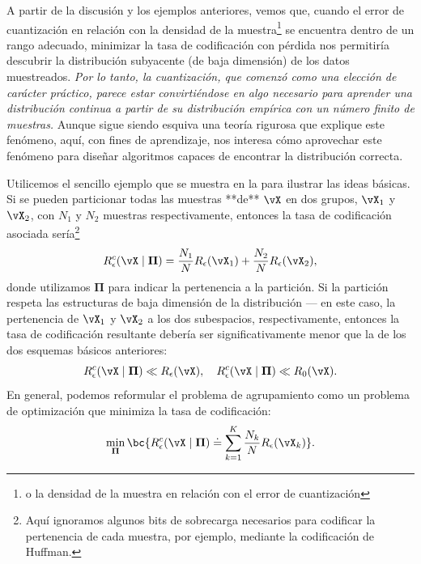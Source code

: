 \documentclass[../../book-main.tex]{subfiles}
\begin{document}
A partir de la discusión y los ejemplos anteriores, vemos que, cuando el
error de cuantización en relación con la densidad de la muestra\footnote{o la
densidad de la muestra en relación con el error de cuantización} se encuentra dentro de un
rango adecuado, minimizar la tasa de codificación con pérdida nos permitiría descubrir
la distribución subyacente (de baja dimensión) de los datos muestreados.
{\em Por lo tanto, la cuantización, que comenzó como una elección de carácter práctico, parece
    estar convirtiéndose en algo necesario para aprender una distribución continua a partir de
su distribución empírica con un número finito de muestras.} Aunque sigue siendo esquiva una teoría rigurosa
que explique este fenómeno, aquí, con
fines de aprendizaje, nos interesa cómo aprovechar este fenómeno para
diseñar algoritmos capaces de encontrar la distribución correcta.

Utilicemos el sencillo ejemplo que se muestra en la  para
ilustrar las ideas básicas. Si se pueden particionar todas las muestras **de** $\vX$ 
en dos grupos, $\vX_1$ y $\vX_2$, con $N_1$ y $N_2$ muestras 
respectivamente, entonces la tasa de codificación asociada sería\footnote{Aquí
    ignoramos algunos bits de sobrecarga necesarios para codificar la pertenencia de
cada muestra, por ejemplo, mediante la codificación de Huffman.}
\begin{equation}
    R_{\epsilon}^c(\vX\mid \boldsymbol{\Pi}) =
    \frac{N_1}{N}R_{\epsilon}(\vX_1) + \frac{N_2}{N}R_{\epsilon}(\vX_2),
\end{equation}
donde utilizamos $\boldsymbol{\Pi}$ para indicar la pertenencia a la
partición. Si la partición respeta las estructuras de baja dimensión
de la distribución --- en este caso, la pertenencia de $\vX_1$ y $\vX_2$ a los
dos subespacios, respectivamente, entonces la tasa de codificación resultante debería ser
significativamente menor que la de los dos esquemas básicos anteriores:
\begin{equation}
    R_{\epsilon}^c(\vX \mid \boldsymbol{\Pi}) \ll R_{\epsilon}(\vX),
    \quad     R_{\epsilon}^c(\vX \mid \boldsymbol{\Pi}) \ll R_0(\vX).
\end{equation}
En general, podemos reformular el problema de agrupamiento como un problema de optimización
que minimiza la tasa de codificación:
\begin{equation}
    \min_{\boldsymbol{\Pi}}  \bc{ R_{\epsilon}^c(\vX \mid \boldsymbol{\Pi})
    \doteq \sum_{k=1}^K \frac{N_k}{N}R_{\epsilon}(\vX_k)}.
\end{equation}
\end{document}
